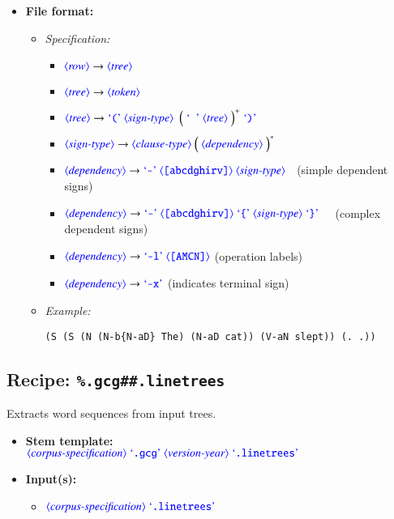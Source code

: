 \documentclass[12pt]{report}
\def\blue{\color{blue}}
\def\magenta{\color{magenta}}
\begin{document}
\begin{itemize}
\item\textbf{File format:}
\begin{itemize}
\item\textit{Specification:}
\begin{itemize}
\item $\dtype{row}  \rightarrow \dtype{tree}$
\item $\dtype{tree} \rightarrow \dtype{token}$
\item $\dtype{tree} \rightarrow \dcode{(} \ \dtype{sign-type} \ \ \smash{\Big( \ \dcode{\ } \ \dtype{tree} \ \Big)^+} \ \dcode{)}$
\item $\dtype{sign-type}  \rightarrow \dtype{clause-type} \ \smash{\Big( \ \dtype{dependency} \ \Big)^*}$
\item $\dtype{dependency} \rightarrow \dcode{-} \ \dexpr{[abcdghirv]} \ \dtype{sign-type}$                    \qquad\quad\ (simple dependent signs)
\item $\dtype{dependency} \rightarrow \dcode{-} \ \dexpr{[abcdghirv]} \ \dcode{\{} \ \dtype{sign-type} \ \dcode{\}}$   \ \ (complex dependent signs)\!\!\!\!\!\!\!\!
\item $\dtype{dependency} \rightarrow \dcode{-l} \ \dexpr{[AMCN]}$   \quad  (operation labels)
\item $\dtype{dependency} \rightarrow \dcode{-x}$                    \quad  (indicates terminal sign)
\end{itemize}

\item\textit{Example:}
{\magenta\begin{verbatim}
(S (S (N (N-b{N-aD} The) (N-aD cat)) (V-aN slept)) (. .))
\end{verbatim}
}
\end{itemize}
\end{itemize}

\subsection{Recipe: {\blue\tt \%.gcg\#\#.linetrees}}

Extracts word sequences from input trees.

\begin{itemize}
      \item \textbf{Stem template:}\\
      $\dtype{corpus-specification} \ \dcode{.gcg} \ \dtype{version-year} \ \dcode{.linetrees}$
      \item \textbf{Input(s):}
      \begin{itemize}
            \item $\dtype{corpus-specification} \ \dcode{.linetrees}$
      \end{itemize}
\end{itemize}
\end{document}
